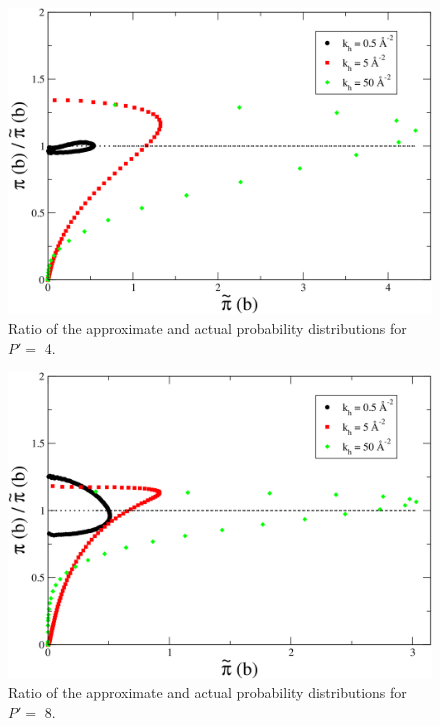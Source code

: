                 \begin{figure}[!htbp]
                    \centering
                    \includegraphics[scale=0.20,keepaspectratio]{Chapter-4/Figures/ratio4B.png}
                    \caption{Ratio of the approximate and actual probability distributions for $P' =$ 4.}
                    \label{fig:ratio4B}
                \end{figure}

                \begin{figure}[!htbp]
                    \centering
                    \includegraphics[scale=0.20,keepaspectratio]{Chapter-4/Figures/ratio8B.png}
                    \caption{Ratio of the approximate and actual probability distributions for $P' =$ 8.}
                    \label{fig:ratio8B}
                \end{figure}

